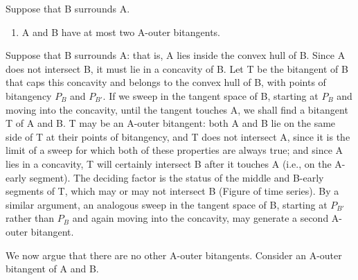 \documentclass[12pt]{article}
\newif\ifCommentary             %
\begin{document}
\ifCommentary
{\em Figure of surrounding object, A-extremal bitangents, A-outer bitangents and A-inner bitangents (perhaps Figure~\ref{fig:backsurrounding}b and~\ref{fig:G2}c may be relevant).}

The complementary generalization of the extremal bitangent, where intersections occur
closer to $P_B$ than to $P_A$, is also important.
They play a role in the definition of both the front and back umbra.
\fi


\begin{lemma}
\label{lem:Aouter}
\ifCommentary
Let A and B be closed curves whose interiors have no intersection.
\fi
Suppose that B surrounds A.
\begin{enumerate}
\item A and B have at most two A-outer bitangents.
\end{enumerate}
\end{lemma}
\prf
Suppose that B surrounds A: that is, A lies inside the convex hull of B.
Since A does not intersect B, it must lie in a concavity of B.
Let T be the bitangent of B that caps this concavity and belongs to the convex hull of B, 
with points of bitangency $P_B$ and $P_{B'}$.
If we sweep in the tangent space of B,
starting at $P_B$ and moving into the concavity, until the tangent touches A,
we shall find a bitangent T of A and B.
T may be an A-outer bitangent: 
both A and B lie on the same side of T at their points of bitangency,
and T does not intersect A, since it is the limit of a sweep for which both of these 
properties are always true; and
since A lies in a concavity, T will certainly intersect B after it touches A
(i.e., on the A-early segment).
The deciding factor is the status of the middle and B-early segments of T,
which may or may not intersect B (Figure of time series).
By a similar argument, an analogous sweep in the tangent space of B, starting at $P_{B'}$ 
rather than $P_B$ and again moving into the concavity, may generate a second
A-outer bitangent.

We now argue that there are no other A-outer bitangents.
Consider an A-outer bitangent of A and B.
\end{document}
